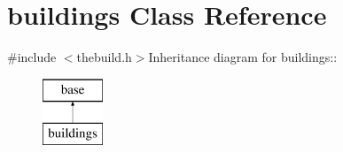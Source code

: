 \hypertarget{classbuildings}{
\section{buildings Class Reference}
\label{classbuildings}
}


{\ttfamily \#include $<$thebuild.h$>$}Inheritance diagram for buildings::\begin{figure}[H]
\begin{center}
\leavevmode
\includegraphics[height=2cm]{classbuildings}
\end{center}
\end{figure}
